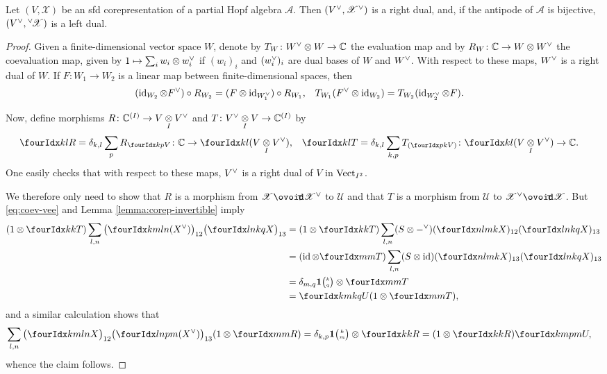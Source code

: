  \begin{Prop}
   Let $(V,\mathscr{X})$ be an sfd corepresentation of a partial Hopf
   algebra $\mathscr{A}$.  Then $(V^{\vee},\mathscr{X}^{\vee})$ is a
right dual, and, if the antipode of $\mathscr{A}$ is bijective,
   $(V^{\vee},{^{\vee}\!\mathscr{X}})$ is a left dual.
\end{Prop}
\begin{proof}
Given a finite-dimensional vector space $W$, denote by $T_{W} \colon
W^{\vee} \otimes W \to \mathbb{C}$ the evaluation map and by $R_{W} \colon \mathbb{C}
\to  W
\otimes W^{\vee}$ the coevaluation map, given by $1\mapsto \sum_{i}
w_{i} \otimes w_{i}^{\vee}$ if $(w_{i})_{i}$ and $(w_{i}^{\vee})_{i}$
are dual bases of $W$ and $W^{\vee}$. With respect to these maps,
$W^{\vee}$ is a right dual of $W$. If $F\colon W_{1}\to W_{2}$ is a linear map between finite-dimensional  spaces, then
\begin{align} \label{eq:coev-vee} (\operatorname{id}_{W_{2}} \otimes F^{\vee}) \circ R_{W_{2}} &= (F \otimes \operatorname{id}_{W_{1}^{\vee}})\circ
  R_{W_{1}}, &
T_{W_{1}}(F^{\vee}
  \otimes \operatorname{id}_{W_{2}})&=  T_{W_{2}}(\operatorname{id}_{W_{2}^{\vee}} \otimes F).
\end{align}

Now, define morphisms $R \colon \mathbb{C}^{(I)} \to V\underset{I}{\otimes} V^{\vee}$ and
$T \colon V^{\vee} \underset{I}{\otimes} V \to \mathbb{C}^{(I)}$ by
\begin{align*}
  \Gru{R}{k}{l} &= \delta_{k,l} \sum_{p} R_{\footnotesize\Gru{V}{k}{p}} \colon
  \C \to 
    \Gru{(V\itimes \dual{V})}{k}{l}, &
  \Gru{T}{k}{l} &= \delta_{k,l} \sum_{k,p} T_{(\Gru{V}{p}{k})} \colon
    \Gru{(V\itimes \dual{V})}{k}{l} \to \C.
\end{align*}
One easily checks that with respect to these maps, $V^{\vee}$ is a
right dual of $V$ in $\mathrm{Vect}_{I^{2}}$. 

We therefore only need to show that $R$ is a morphism from
$\mathscr{X}\Circt\dual{\mathscr{X}}$ to $\mathscr{U}$ and that $T$ is
a morphism from $\mathscr{U}$ to
$\dual{\mathscr{X}}\Circt{\mathscr{X}}$.  But \eqref{eq:coev-vee} and
Lemma \ref{lemma:corep-invertible} imply
  \begin{align*}
    (1\otimes \Gru{T}{k}{k})
 \sum_{l,n}  \big(
\Gr{(\dual{X})}{k}{l}{m}{n}\big)_{12}
\big(\Gr{X}{l}{k}{n}{q}\big)_{13} &=
    (1\otimes \Gru{T}{k}{k})
 \sum_{l,n} 
(S \otimes \dual{-})(\Gr{X}{n}{m}{l}{k})_{12}
    (\Gr{X}{l}{k}{n}{q})_{13} \\ &=
(\id\otimes \Gru{T}{m}{m})  \sum_{l,n}
      (S \otimes \id)(\Gr{X}{n}{m}{l}{k})_{13}(\Gr{X}{l}{k}{n}{q})_{13} \\
    &= \delta_{m,q}\UnitC{k}{q}\otimes \Gru{T}{m}{m} \\
    &= \Gr{U}{k}{k}{m}{q}(1 \otimes \Gru{T}{m}{m}),
  \end{align*}
and a similar  calculation shows that 
\begin{align*}
 \sum_{l,n}  \big(
\Gr{X}{k}{l}{m}{n}\big)_{12}
\big(\Gr{(\dual{X})}{l}{p}{n}{m}\big)_{13} 
    (1\otimes \Gru{R}{m}{m})
&= \delta_{k,p} \UnitC{k}{m} \otimes \Gru{R}{k}{k} = (1 \otimes
\Gru{R}{k}{k}) \Gr{U}{k}{p}{m}{m},
\end{align*}
whence the claim follows.
\end{proof}
